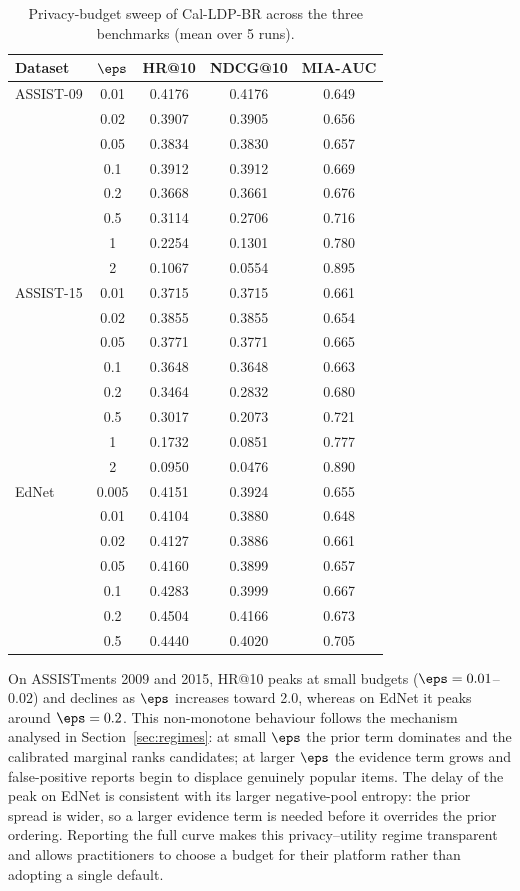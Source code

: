 \begin{table}[t]
\caption{Privacy-budget sweep of Cal-LDP-BR across the three benchmarks (mean over 5 runs).}
\label{tab:sweep}
\small
\begin{tabular}{@{}lcccc@{}}
\toprule
Dataset & $\eps$ & HR@10 & NDCG@10 & MIA-AUC \\
\midrule
ASSIST-09 & 0.01 & 0.4176 & 0.4176 & 0.649 \\
 & 0.02 & 0.3907 & 0.3905 & 0.656 \\
 & 0.05 & 0.3834 & 0.3830 & 0.657 \\
 & 0.1 & 0.3912 & 0.3912 & 0.669 \\
 & 0.2 & 0.3668 & 0.3661 & 0.676 \\
 & 0.5 & 0.3114 & 0.2706 & 0.716 \\
 & 1 & 0.2254 & 0.1301 & 0.780 \\
 & 2 & 0.1067 & 0.0554 & 0.895 \\
\midrule
ASSIST-15 & 0.01 & 0.3715 & 0.3715 & 0.661 \\
 & 0.02 & 0.3855 & 0.3855 & 0.654 \\
 & 0.05 & 0.3771 & 0.3771 & 0.665 \\
 & 0.1 & 0.3648 & 0.3648 & 0.663 \\
 & 0.2 & 0.3464 & 0.2832 & 0.680 \\
 & 0.5 & 0.3017 & 0.2073 & 0.721 \\
 & 1 & 0.1732 & 0.0851 & 0.777 \\
 & 2 & 0.0950 & 0.0476 & 0.890 \\
\midrule
EdNet & 0.005 & 0.4151 & 0.3924 & 0.655 \\
 & 0.01 & 0.4104 & 0.3880 & 0.648 \\
 & 0.02 & 0.4127 & 0.3886 & 0.661 \\
 & 0.05 & 0.4160 & 0.3899 & 0.657 \\
 & 0.1 & 0.4283 & 0.3999 & 0.667 \\
 & 0.2 & 0.4504 & 0.4166 & 0.673 \\
 & 0.5 & 0.4440 & 0.4020 & 0.705 \\
\bottomrule
\end{tabular}
\end{table}

On ASSISTments 2009 and 2015, HR@10 peaks at small budgets ($\eps=0.01$--$0.02$) and declines as $\eps$ increases toward 2.0, whereas on EdNet it peaks around $\eps=0.2$. This non-monotone behaviour follows the mechanism analysed in Section~\ref{sec:regimes}: at small $\eps$ the prior term dominates and the calibrated marginal ranks candidates; at larger $\eps$ the evidence term grows and false-positive reports begin to displace genuinely popular items. The delay of the peak on EdNet is consistent with its larger negative-pool entropy: the prior spread is wider, so a larger evidence term is needed before it overrides the prior ordering. Reporting the full curve makes this privacy--utility regime transparent and allows practitioners to choose a budget for their platform rather than adopting a single default.

